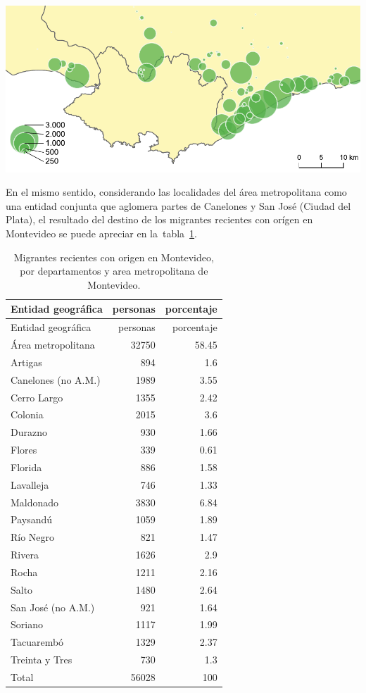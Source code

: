 \documentclass[12pt,spanish,]{article}
\let\origfigure\figure
\let\endorigfigure\endfigure
\renewenvironment{figure}[1][2] {
    \expandafter\origfigure\expandafter[H]
} {
    \endorigfigure
}
\begin{document}
\begin{figure}
\hypertarget{fig:mig_ori_mvo_zoom}{%
\centering
\includegraphics{./tex2pdf.-8c1f0593c1a83dbe/793a57bf2535638b71297054eae27fd13945f2db.pdf}
\caption{Migrantes internos con origen en Montevideo, zoom a área
metropolitana de Montevideo}\label{fig:mig_ori_mvo_zoom}
}
\end{figure}

En el mismo sentido, considerando las localidades del área metropolitana
como una entidad conjunta que aglomera partes de Canelones y San José
(Ciudad del Plata), el resultado del destino de los migrantes recientes
con orígen en Montevideo se puede apreciar en la~tabla~\ref{tbl:mig_am}.

\hypertarget{tbl:mig_am}{}
\begin{longtable}[]{@{}lrr@{}}
\caption{\label{tbl:mig_am}Migrantes recientes con origen en Montevideo,
por departamentos y area metropolitana de Montevideo.}\tabularnewline
\toprule
Entidad geográfica & personas & porcentaje\tabularnewline
\midrule
\endfirsthead
\toprule
Entidad geográfica & personas & porcentaje\tabularnewline
\midrule
\endhead
Área metropolitana & 32750 & 58.45\tabularnewline
Artigas & 894 & 1.6\tabularnewline
Canelones (no A.M.) & 1989 & 3.55\tabularnewline
Cerro Largo & 1355 & 2.42\tabularnewline
Colonia & 2015 & 3.6\tabularnewline
Durazno & 930 & 1.66\tabularnewline
Flores & 339 & 0.61\tabularnewline
Florida & 886 & 1.58\tabularnewline
Lavalleja & 746 & 1.33\tabularnewline
Maldonado & 3830 & 6.84\tabularnewline
Paysandú & 1059 & 1.89\tabularnewline
Río Negro & 821 & 1.47\tabularnewline
Rivera & 1626 & 2.9\tabularnewline
Rocha & 1211 & 2.16\tabularnewline
Salto & 1480 & 2.64\tabularnewline
San José (no A.M.) & 921 & 1.64\tabularnewline
Soriano & 1117 & 1.99\tabularnewline
Tacuarembó & 1329 & 2.37\tabularnewline
Treinta y Tres & 730 & 1.3\tabularnewline
Total & 56028 & 100\tabularnewline
\bottomrule
\end{longtable}
\end{document}
